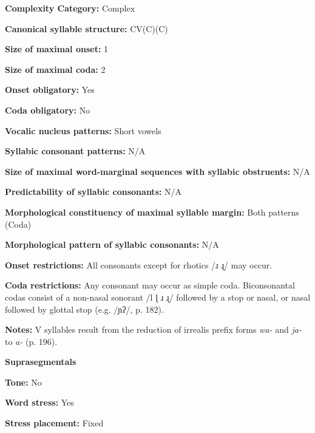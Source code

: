 \textbf{Complexity Category:} Complex



\textbf{Canonical syllable structure:} CV(C)(C) \citep[186-96]{Merlan1989}



\textbf{Size of maximal onset:} 1



\textbf{Size of maximal coda:} 2



\textbf{Onset obligatory:} Yes



\textbf{Coda obligatory:} No



\textbf{Vocalic nucleus patterns:} Short vowels



\textbf{Syllabic consonant patterns:} N/A



\textbf{Size of maximal word{}-marginal sequences with syllabic obstruents:} N/A



\textbf{Predictability of syllabic consonants:} N/A



\textbf{Morphological constituency of maximal syllable margin:} Both patterns (Coda)



\textbf{Morphological pattern of syllabic consonants:} N/A



\textbf{Onset restrictions:} All consonants except for rhotics /ɹ ɻ/ may occur.



\textbf{Coda restrictions:} Any consonant may occur as simple coda. Biconsonantal codas consist of a non-nasal sonorant /l ɭ ɹ ɻ/ followed by a stop or nasal, or nasal followed by glottal stop (e.g. /ɲʔ/, p. 182).



\textbf{Notes:} V syllables result from the reduction of irrealis prefix forms \textit{wa-} and \textit{ja-} to \textit{a-} (p. 196).



\textbf{Suprasegmentals}



\textbf{Tone:} No



\textbf{Word stress:} Yes



\textbf{Stress placement:} Fixed



